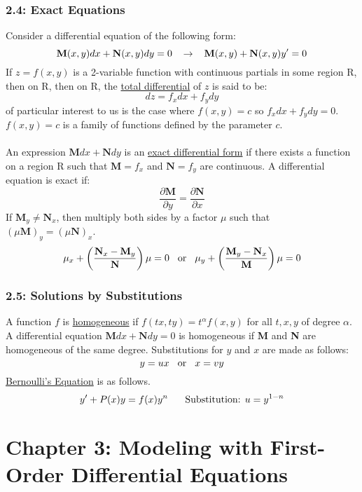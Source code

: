 \documentclass{article}
\begin{document}
\section*{2.4: Exact Equations}
Consider a differential equation of the following form:
\[\textbf{M}(x,y)dx+\textbf{N}(x,y)dy=0\hspace{3 mm}\rightarrow\hspace{3 mm}\textbf{M}(x,y)+\textbf{N}(x,y)y'=0\]
If \(z=f(x,y)\) is a 2-variable function with continuous partials in some region R, then on R, then on R, the \underline{total differential} of \(z\) is said to be:
\[dz=f_xdx+f_ydy\]
of particular interest to us is the case where \(f(x,y)=c\) so \(f_xdx+f_ydy=0\). \(f(x,y)=c\) is a family of functions defined by the parameter \(c\). \\\\
An expression \(\textbf{M}dx+\textbf{N}dy\) is an \underline{exact differential form} if there exists a function on a region R such that \(\textbf{M}=f_x\) and \(\textbf{N}=f_y\) are continuous. A differential equation is exact if:
\[\frac{\partial\textbf{M}}{\partial y}=\frac{\partial\textbf{N}}{\partial x}\]
If \(\textbf{M}_y\neq\textbf{N}_x\), then multiply both sides by a factor \(\mu\) such that \((\mu\textbf{M})_y=(\mu\textbf{N})_x\).
\[\mu_x+\left(\frac{\textbf{N}_x-\textbf{M}_y}{\textbf{N}}\right)\mu=0\hspace{3 mm}\textnormal{or}\hspace{3 mm}\mu_y+\left(\frac{\textbf{M}_y-\textbf{N}_x}{\textbf{M}}\right)\mu=0\]
\section*{2.5: Solutions by Substitutions}
A function \(f\) is \underline{homogeneous} if \(f(tx,ty)=t^\alpha f(x,y)\) for all \(t,x,y\) of degree \(\alpha\). A differential equation \(\textbf{M}dx+\textbf{N}dy=0\) is homogeneous if \textbf{M} and \textbf{N} are homogeneous of the same degree. Substitutions for \(y\) and \(x\) are made as follows:
\[y=ux\hspace{3 mm}\textnormal{or}\hspace{3 mm}x=vy\]
\underline{Bernoulli's Equation} is as follows.
\[y'+P(x)y=f(x)y^n\hspace{5 mm}\textnormal{ Substitution: }u=y^{1-n}\]
\part*{Chapter 3: Modeling with First-Order Differential Equations}
\end{document}
